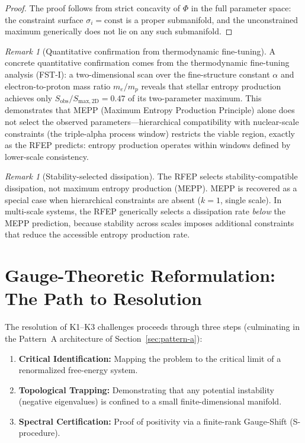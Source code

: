 \documentclass[12pt,a4paper]{article}
\theoremstyle{definition}
\theoremstyle{remark}
\newtheorem{remark}[theorem]{Remark}
\begin{document}
\begin{proof}
The proof follows from strict concavity of $\Phi$ in the full parameter space: the constraint surface $\sigma_i = \text{const}$ is a proper submanifold, and the unconstrained maximum generically does not lie on any such submanifold.
\end{proof}

\begin{remark}[Quantitative confirmation from thermodynamic fine-tuning]
\label{rem:rfep-thermo-confirmation}
A concrete quantitative confirmation comes from the thermodynamic fine-tuning analysis (FST-I): a two-dimensional scan over the fine-structure constant $\alpha$ and electron-to-proton mass ratio $m_e/m_p$ reveals that stellar entropy production achieves only $S_{\mathrm{obs}}/S_{\mathrm{max,2D}} = 0.47$ of its two-parameter maximum. This demonstrates that MEPP (Maximum Entropy Production Principle) alone does not select the observed parameters---hierarchical compatibility with nuclear-scale constraints (the triple-alpha process window) restricts the viable region, exactly as the RFEP predicts: entropy production operates within windows defined by lower-scale consistency.
\end{remark}

\begin{remark}[Stability-selected dissipation]
\label{rem:stability-dissipation}
The RFEP selects stability-compatible dissipation, not maximum entropy production (MEPP). MEPP is recovered as a special case when hierarchical constraints are absent ($k=1$, single scale). In multi-scale systems, the RFEP generically selects a dissipation rate \emph{below} the MEPP prediction, because stability across scales imposes additional constraints that reduce the accessible entropy production rate.
\end{remark}

\section{Gauge-Theoretic Reformulation: The Path to Resolution}

The resolution of K1--K3 challenges proceeds through three steps (culminating in the Pattern~A architecture of Section~\ref{sec:pattern-a}):
\begin{enumerate}
    \item \textbf{Critical Identification:} Mapping the problem to the critical limit of a renormalized free-energy system.
    \item \textbf{Topological Trapping:} Demonstrating that any potential instability (negative eigenvalues) is confined to a small finite-dimensional manifold.
    \item \textbf{Spectral Certification:} Proof of positivity via a finite-rank Gauge-Shift (S-procedure).
\end{enumerate}
\end{document}
